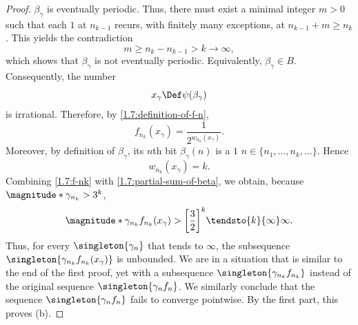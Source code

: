 \begin{proof}
$\beta_\gamma$ is eventually periodic. Thus, there must exist a minimal integer $m > 0$ such that each $1$ at $n_{k-1}$ %
recurs, with finitely many exceptions, at $n_{k-1} + m \geq n_{k}$. This yields the contradiction 
%
\begin{equation}
  m \geq n_{k} - n_{k-1} > k \to \infty,
\end{equation}
%
which shows that $\beta_\gamma$ is not eventually periodic. Equivalently, $\beta_\gamma \in B$. Consequently, the number
%
\begin{equation}
  x_\gamma \Def \psi(\beta_\gamma)
\end{equation}
%
is irrational. Therefore, by \eqref{1.7:definition-of-f-n}, 
%
\begin{equation}\label{1.7:f-nk}
  f_{n_k}(x_\gamma) = \frac{1}{2^{w_{n_k}(x_\gamma)}}. 
\end{equation}
%
Moreover, by definition of $\beta_\gamma$, its $n$th bit $\beta_{\gamma}(n)$ is a $1$ \IFF $n \in \{n_1, \dots, n_k, \dots\}$. 
Hence 
%
\begin{equation}\label{1.7:partial-sum-of-beta}
  w_{n_k}(x_\gamma) = k.
\end{equation}
%
Combining \eqref{1.7:f-nk} with \eqref{1.7:partial-sum-of-beta}, we obtain, because $\magnitude*{\gamma_{n_k}} > 3^k$, 
%
\begin{equation}
  \magnitude*{\gamma_{n_k} f_{n_k}(x_\gamma)} > \biggl[\frac{3}{2}\biggr]^k \tendsto{k}{\infty}\infty. 
\end{equation}
%
Thus, for every $\singleton{\gamma_n}$ that tends to $\infty$, the subsequence $\singleton{\gamma_{n_k} f_{n_k}(x_\gamma)}$ %
is unbounded. We are in a situation that is similar to the end of the first proof, yet with a subsequence %
$\singleton{\gamma_{n_k} f_{n_k}}$ instead of the original sequence $\singleton{\gamma_{n} f_{n}}$. We similarly conclude that 
the sequence $\singleton{\gamma_n f_n}$ fails to converge pointwise. By the first part, this proves (b). 
\end{proof}
%
% 
